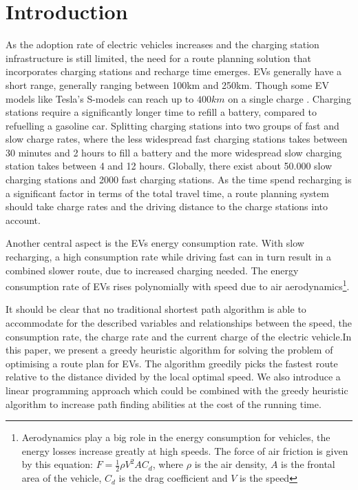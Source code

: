 \section{Introduction}

As the adoption rate of electric vehicles increases \cite{Henry2013} and the charging station infrastructure is still limited, the need for a route planning solution that incorporates charging stations and recharge time emerges. EVs generally have a short range, generally ranging between 100km and 250km. Though some EV models like Tesla's S-models can reach up to $400\si{km}$ on a single charge \cite{teslacon}. Charging stations require a significantly longer time to refill a battery, compared to refuelling a gasoline car. Splitting charging stations into two groups of fast and slow charge rates, where the less widespread fast charging stations takes between 30 minutes and 2 hours to fill a battery and the more widespread slow charging station takes between 4 and 12 hours. Globally, there exist about 50.000 slow charging stations and 2000 fast charging stations\cite{Globalevoutlook}. As the time spend recharging is a significant factor in terms of the total travel time, a route planning system should take charge rates and the driving distance to the charge stations into account.

Another central aspect is the EVs energy consumption rate. With slow recharging, a high consumption rate while driving fast can in turn result in a combined slower route, due to increased charging needed. The energy consumption rate of EVs rises polynomially with speed due to air aerodynamics\footnote{Aerodynamics play a big role in the energy consumption for vehicles, the energy losses increase greatly at high speeds. The force of air friction is given by this equation: $F = \frac{1}{2} \rho V^2 A C_d$, where $\rho$ is the air density, $A$ is the frontal area of the vehicle, $C_d$ is the drag coefficient and $V$ is the speed}.

It should be clear that no traditional shortest path algorithm is able to accommodate for the described variables and relationships between the speed, the consumption rate, the charge rate and the current charge of the electric vehicle.In this paper, we present a greedy heuristic algorithm for solving the problem of optimising a route plan for EVs. The algorithm greedily picks the fastest route relative to the distance divided by the local optimal speed. We also introduce a linear programming approach which could be combined with the greedy heuristic algorithm to increase path finding abilities at the cost of the running time.  
